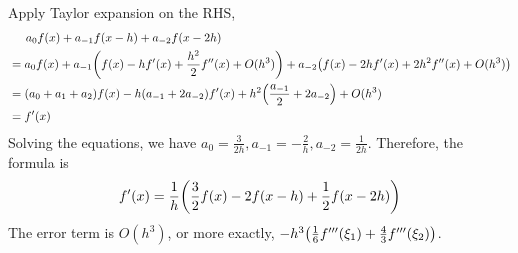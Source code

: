\documentclass[10pt]{report}
\DeclarePairedDelimiter\autoparen{(}{)}
\newcommand{\pa}[1]{\autoparen*{#1}}
\begin{document}
\begin{enumerate}
	Apply Taylor expansion on the RHS,
	\begin{align*}
		&\phantom{\ =\ } a_0 f(x) + a_{-1}f(x-h) + a_{-2}f(x-2h)\\
		&= a_0 f(x) + a_{-1} \pa{f(x) - hf'(x) + \frac{h^2}{2} f''(x) + O(h^3)} + a_{-2} \pa{f(x) - 2hf'(x) + 2h^2 f''(x) + O(h^3)}\\
		&= (a_0 + a_1 + a_2)f(x) - h(a_{-1} + 2a_{-2})f'(x) + h^2\pa{\frac{a_{-1}}{2} + 2a_{-2}} + O(h^3)\\
		&= f'(x)
	\end{align*}
	Solving the equations, we have $a_0 = \frac{3}{2h}, a_{-1} = -\frac{2}{h}, a_{-2} = \frac{1}{2h}$. Therefore, the formula is
	\[
	f'(x) = \frac{1}{h}\pa{\frac{3}{2} f(x) - 2f(x-h) + \frac{1}{2}f(x-2h)}
	\]
	The error term is $O(h^3)$, or more exactly, $-h^3\pa{\frac{1}{6}f'''(\xi_1) + \frac{4}{3}f'''(\xi_2)}$.
	
\end{enumerate}
\end{document}
